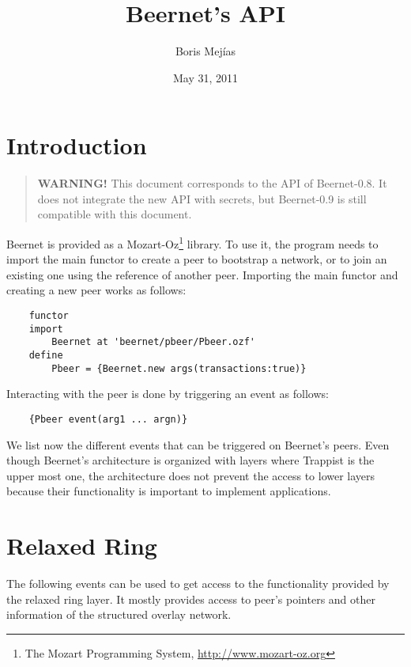 \documentclass[11pt]{article}
\title{Beernet's API}
\author{Boris Mej\'{i}as}
\date{May 31, 2011}
\begin{document}
\maketitle

\section{Introduction}

\begin{quote}

{\bf WARNING!} This document corresponds to the API of Beernet-0.8. It does
not integrate the new API with secrets, but Beernet-0.9 is still compatible with
this document.

\end{quote}

Beernet is provided as a Mozart-Oz\footnote{The Mozart Programming System,
\url{http://www.mozart-oz.org}} library. To use it, the program needs to
import the main functor to create a peer to bootstrap a network, or to join an
existing one using the reference of another peer. Importing the main functor
and creating a new peer works as follows:

\begin{lstlisting}
	functor
	import
		Beernet at 'beernet/pbeer/Pbeer.ozf'
	define
		Pbeer = {Beernet.new args(transactions:true)}
\end{lstlisting}

Interacting with the peer is done by triggering an event as follows:

\begin{lstlisting}
	{Pbeer event(arg1 ... argn)}
\end{lstlisting}

We list now the different events that can be triggered on Beernet's peers.
Even though Beernet's architecture is organized with layers where Trappist is
the upper most one, the architecture does not prevent the access to lower
layers because their functionality is important to implement applications.

\section{Relaxed Ring}

The following events can be used to get access to the functionality provided
by the relaxed ring layer. It mostly provides access to peer's pointers and
other information of the structured overlay network. 
\end{document}
